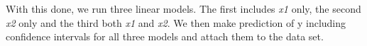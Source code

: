 \documentclass[]{article}
\newenvironment{Shaded}{\begin{snugshade}}{\end{snugshade}}
\newcommand{\DataTypeTok}[1]{\textcolor[rgb]{0.13,0.29,0.53}{#1}}
\newcommand{\DecValTok}[1]{\textcolor[rgb]{0.00,0.00,0.81}{#1}}
\newcommand{\FloatTok}[1]{\textcolor[rgb]{0.00,0.00,0.81}{#1}}
\newcommand{\KeywordTok}[1]{\textcolor[rgb]{0.13,0.29,0.53}{\textbf{#1}}}
\newcommand{\NormalTok}[1]{#1}
\newcommand{\OperatorTok}[1]{\textcolor[rgb]{0.81,0.36,0.00}{\textbf{#1}}}
\newcommand{\StringTok}[1]{\textcolor[rgb]{0.31,0.60,0.02}{#1}}
\begin{document}
\begin{Shaded}
\end{Shaded}

With this done, we run three linear models. The first includes \emph{x1} only, the second \emph{x2} only and the third both \emph{x1} and \emph{x2}. We then make prediction of y including confidence intervals for all three models and attach them to the data set.
\end{document}
